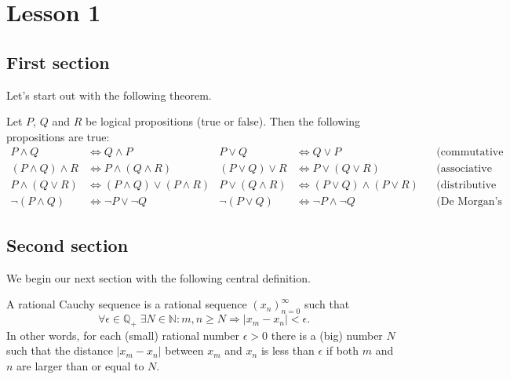 \documentclass{tstextbook}
\begin{document}
	
	
	\chapter{Lesson 1}
	
	\section{First section}
	
	Let's start out with the following theorem.
	
	\begin{theorem}
		\label{th:logicalgebra}
		Let $P$, $Q$ and $R$ be logical propositions (true or false).
		Then the following propositions are true:
		\small
		\begin{align*}
			P \land Q &\Leftrightarrow Q \land P &
			P \lor  Q &\Leftrightarrow Q \lor P  &&
			\text{(commutative laws)} \\
			(P \land Q) \land R &\Leftrightarrow P \land (Q \land R) &
			(P \lor Q)  \lor  R &\Leftrightarrow P \lor  (Q \lor  R) &&
			\text{(associative laws)} \\
			P \land (Q \lor  R) &\Leftrightarrow (P \land Q) \lor  (P \land R) &
			P \lor  (Q \land R) &\Leftrightarrow (P \lor  Q) \land (P \lor  R) &&
			\text{(distributive laws)} \\
			\lnot (P \land Q) &\Leftrightarrow \lnot P \lor  \lnot Q &
			\lnot (P \lor  Q) &\Leftrightarrow \lnot P \land \lnot Q &&
			\text{(De Morgan's laws)}
		\end{align*}
	\end{theorem}
	
	\section{Second section}
	
	We begin our next section with the following central definition.
	
	\begin{definition}
		\label{th:rationalcauchysequence}
		A rational Cauchy sequence is a rational sequence
		$(x_n)_{n=0}^{\infty}$ such that
		\begin{equation}
			\forall \epsilon \in \mathbb{Q}_+ \;
			\exists N \in \mathbb{N} : m, n \geq N \Rightarrow |x_m - x_n| < \epsilon.
		\end{equation}
		In other words, for each (small) rational number $\epsilon > 0$
		there is a (big) number $N$ such that the distance $|x_m - x_n|$
		between $x_m$ and $x_n$ is less than $\epsilon$ if both $m$ and $n$
		are larger than or equal to $N$.
	\end{definition}
	
\end{document}
